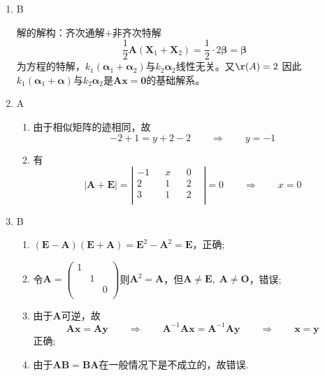 \begin{enumerate}
    \item B 
    
    解的解构：齐次通解\(+\)非齐次特解
    \[\frac{1}{2} \bm{A} ( \bm{X}_1 + \bm{X}_2) = \frac{1}{2}\cdot 2 \bm{\beta} = \bm{\beta}\]为方程的特解，\(k_1(\bm{\alpha}_1 + \bm{\alpha}_2)\)与\(k_2 \bm{\alpha}_2\)线性无关。又\(\r (A) = 2\)
    因此\(k_1(\bm{\alpha}_1 + \bm{\alpha})\)与\(k_2 \bm{\alpha}_2\)是\(\boldsymbol{Ax} = \boldsymbol{0}\)的基础解系。

    \item A

    \begin{enumerate}[(1)]
        \item 由于相似矩阵的迹相同，故\[-2 + 1 = y + 2 - 2 \qquad \Longrightarrow\qquad y = -1\]
        \item 有\[|\boldsymbol{A} + \boldsymbol{E}| = \left|\begin{aligned}
             -1 & &  x &  & 0 &  \\   2 & &  1 & & 2  & \\ 3 & &  1 &  & 2 & \\
        \end{aligned} \right|= 0\qquad \Longrightarrow\qquad x = 0\]
    \end{enumerate}

    \item B

    \begin{enumerate}[(1)]
        \item \((\boldsymbol{E} - \boldsymbol{A})(\boldsymbol{E} + \boldsymbol{A}) = \boldsymbol{E}^2 - \boldsymbol{A}^2 = \boldsymbol{E}\)，正确;
        \item 令\(\displaystyle\boldsymbol{A} = \begin{pmatrix}
            1 & & \\ & 1 & \\ & & 0\\
        \end{pmatrix}
        \)则\(\boldsymbol{A} ^ 2 = \boldsymbol{A}\)，但\(\boldsymbol{A} \neq \boldsymbol{E},\; \boldsymbol{A}\neq \boldsymbol{O}\)，错误;
        \item 由于\(\boldsymbol{A}\)可逆，故\[\boldsymbol{Ax} = \boldsymbol{Ay} \qquad \Longrightarrow\qquad \boldsymbol{A}^{-1} \boldsymbol{Ax} = \boldsymbol{A}^{-1} \boldsymbol{Ay} \qquad \Longrightarrow \qquad \boldsymbol{x} = \boldsymbol{y}\]正确;
        \item 由于\(\boldsymbol{AB} = \boldsymbol{BA}\)在一般情况下是不成立的，故错误.
    \end{enumerate}


\end{enumerate}
